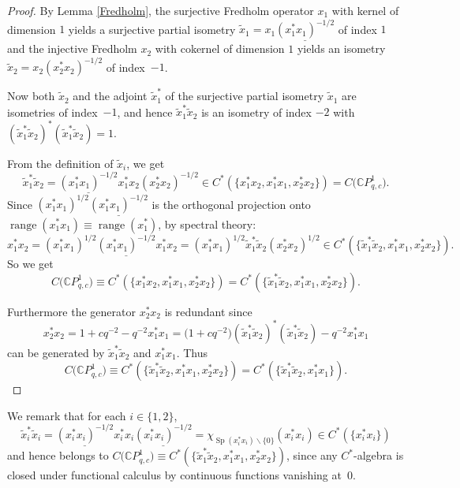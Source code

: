 \documentclass[pdftex]{sigma}
\begin{document}
\begin{proof} By Lemma \ref{Fredholm}, the surjective Fredholm operator $x_{1}$ with kernel of
dimension $1$ yields a surjective partial isometry $\tilde{x}_{1}%
=x_{1}\underline{( x_{1}^{\ast}x_{1}) ^{-1/2}}$ of index $1$ and
the injective Fredholm $x_{2}$ with cokernel of dimension $1$ yields an
isometry $\tilde{x}_{2}=x_{2}( x_{2}^{\ast}x_{2}) ^{-1/2}$ of
index~$-1$.

Now both $\tilde{x}_{2}$ and the adjoint $\tilde{x}_{1}^{\ast}$ of the
surjective partial isometry $\tilde{x}_{1}$ are isometries of index~$-1$, and
hence $\tilde{x}_{1}^{\ast}\tilde{x}_{2}$ is an isometry of index $-2$ with
$( \tilde{x}_{1}^{\ast}\tilde{x}_{2}) ^{\ast}( \tilde
{x}_{1}^{\ast}\tilde{x}_{2}) =1$.

From the definition of $\tilde{x}_{i}$, we get
\[
\tilde{x}_{1}^{\ast}\tilde{x}_{2}=\underline{( x_{1}^{\ast}x_{1})
^{-1/2}}x_{1}^{\ast}x_{2}( x_{2}^{\ast}x_{2}) ^{-1/2}\in C^{\ast
}( \{ x_{1}^{\ast}x_{2},x_{1}^{\ast}x_{1},x_{2}^{\ast}%
x_{2}\}) =C\big(\mathbb{C}P_{q,c}^{1}\big) .
\]
Since $( x_{1}^{\ast}x_{1}) ^{1/2}\underline{(
x_{1}^{\ast}x_{1}) ^{-1/2}}$ is the orthogonal projection onto
$\operatorname{range}( x_{1}^{\ast}x_{1}) \equiv
\operatorname{range}( x_{1}^{\ast}) $, by spectral theory:
\[
x_{1}^{\ast}x_{2}=( x_{1}^{\ast}x_{1}) ^{1/2}\underline{(
x_{1}^{\ast}x_{1}) ^{-1/2}}x_{1}^{\ast}x_{2}=( x_{1}^{\ast}%
x_{1}) ^{1/2}\tilde{x}_{1}^{\ast}\tilde{x}_{2}( x_{2}^{\ast}%
x_{2}) ^{1/2}\in C^{\ast}( \{ \tilde{x}_{1}^{\ast}\tilde
{x}_{2},x_{1}^{\ast}x_{1},x_{2}^{\ast}x_{2}\}) .
\]
So we get
\[
C\big(\mathbb{C}P_{q,c}^{1}\big) \equiv C^{\ast}(\{
x_{1}^{\ast}x_{2},x_{1}^{\ast}x_{1},x_{2}^{\ast}x_{2}\})
=C^{\ast}(\{ \tilde{x}_{1}^{\ast}\tilde{x}_{2},x_{1}^{\ast}%
x_{1},x_{2}^{\ast}x_{2}\} ) .
\]


Furthermore the generator $x_{2}^{\ast}x_{2}$ is redundant since%
\[
x_{2}^{\ast}x_{2}=1+cq^{-2}-q^{-2}x_{1}^{\ast}x_{1}=\big( 1+cq^{-2}\big)
 ( \tilde{x}_{1}^{\ast}\tilde{x}_{2} ) ^{\ast} ( \tilde{x}%
_{1}^{\ast}\tilde{x}_{2} ) -q^{-2}x_{1}^{\ast}x_{1}
\]
can be generated by $\tilde{x}_{1}^{\ast}\tilde{x}_{2}$ and $x_{1}^{\ast}%
x_{1}$. Thus
\[
C\big(\mathbb{C}P_{q,c}^{1}\big) \equiv C^{\ast} ( \{
\tilde{x}_{1}^{\ast}\tilde{x}_{2},x_{1}^{\ast}x_{1},x_{2}^{\ast}x_{2} \}
 ) =C^{\ast} ( \{ \tilde{x}_{1}^{\ast}\tilde{x}_{2},x_{1}^{\ast}x_{1} \} ) .\tag*{\qed}
\]
\renewcommand{\qed}{}
\end{proof}


We remark that for each $i\in \{ 1,2 \} $,
\[
\tilde{x}_{i}^{\ast}\tilde{x}_{i}=\underline{( x_{i}^{\ast}x_{i})
^{-1/2}}x_{i}^{\ast}x_{i}\underline{( x_{i}^{\ast}x_{i}) ^{-1/2}%
}=\chi_{\operatorname{Sp}( x_{i}^{\ast}x_{i}) \backslash\{
0\} }( x_{i}^{\ast}x_{i}) \in C^{\ast}( \{
x_{i}^{\ast}x_{i}\} )
\]
and hence belongs to $C\big(\mathbb{C}P_{q,c}^{1}\big) \equiv C^{\ast
} ( \{ \tilde{x}_{1}^{\ast}\tilde{x}_{2},x_{1}^{\ast}x_{1}%
,x_{2}^{\ast}x_{2} \} ) $, since any $C^*$-algebra is closed under
functional calculus by continuous functions vanishing at~$0$.
\end{document}
